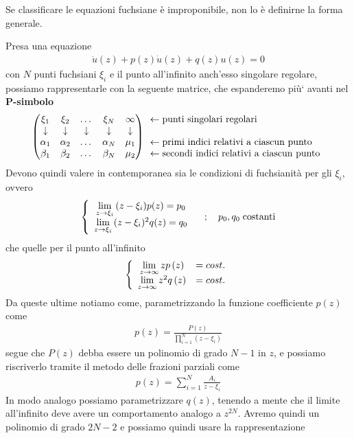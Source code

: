 Se classificare le equazioni fuchsiane è improponibile, non lo è definirne la forma generale.

Presa una equazione
\begin{align}
	\ddot{u}(z) + p(z)\dot{u}(z) + q(z)u(z) = 0
\end{align}
con $N$ punti fuchsiani $\xi_i$ e il punto all'infinito anch'esso singolare regolare, possiamo rappresentarle con la seguente matrice, che espanderemo più` avanti nel \textbf{P-simbolo}
\begin{align}
	\begin{pmatrix}
		\xi_1 & \xi_2 & \dots & \xi_N & \infty\\
		\downarrow & \downarrow & \downarrow & \downarrow & \downarrow\\
		\alpha_1 & \alpha_2 & \dots & \alpha_N & \mu_1\\
		\beta_1 & \beta_2 & \dots & \beta_N & \mu_2
	\end{pmatrix} \begin{array}{c}
	\leftarrow \text{punti singolari regolari} \hfill \\
	\\
	\leftarrow \text{primi indici relativi a ciascun punto}\hfill\\
	\leftarrow \text{secondi indici relativi a ciascun punto}
\end{array}
\end{align}
Devono quindi valere in contemporanea sia le condizioni di fuchsianità per gli $\xi_i$, ovvero
\begin{align}
	\left\{ \begin{array}{cc} \underset{z \rightarrow \xi_i}{\lim} \, (z-\xi_i)p(z) = p_0\\ \underset{z \rightarrow \xi_i}{\lim} \, (z-\xi_i)^2 q(z)= q_0 \end{array} \right. \quad ; \quad p_0, q_0 \; \text{costanti} \label{omegakek}
\end{align}
che quelle per il punto all'infinito
\begin{align}
	\double{\limit{z}{\infty}zp\left(z\right) &= cost. \hfill}{\limit{z}{\infty} z^2 q\left(z\right) &= cost.}
\end{align}
Da queste ultime notiamo come, parametrizzando la funzione coefficiente $p(z)$ come 
\begin{align}
	p(z) = \frac{P(z)}{\prod_{i=1}^{N}(z-\xi_i)}
\end{align}
segue che $P(z)$ debba essere un polinomio di grado $N-1$ in $z$, e possiamo riscriverlo tramite il metodo delle frazioni parziali come
\begin{align}
	p(z) = \sum_{i=1}^{N} \frac{A_i}{z-\xi_i}
\end{align}
In modo analogo possiamo parametrizzare $q(z)$, tenendo a mente che il limite all'infinito deve avere un comportamento analogo a $z^{2N}$. Avremo quindi un polinomio di grado $2N-2$ e possiamo quindi usare la rappresentazione
